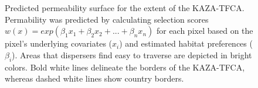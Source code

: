 \documentclass[abstract=on,10pt,a4paper,bibliography=totocnumbered]{scrartcl}
\begin{document}
\begin{figure}[hbtp]
  \begin{center}
    \caption{Predicted permeability surface for the extent of the KAZA-TFCA.
    Permability was predicted by calculating selection scores \(w(x) =
    exp(\beta_1 x_1 + \beta_2 x_2 + ... + \beta_n x_n)\) for each pixel based on
    the pixel's underlying covariates (\(x_i\)) and estimated habitat
    preferences (\(\beta_i\)). Areas that dispersers find easy to traverse are
    depicted in bright colors. Bold white lines delineate the borders of the
    KAZA-TFCA, whereas dashed white lines show country borders.}
    \label{PermeabilityMap}
  \end{center}
\end{figure}
\end{document}

